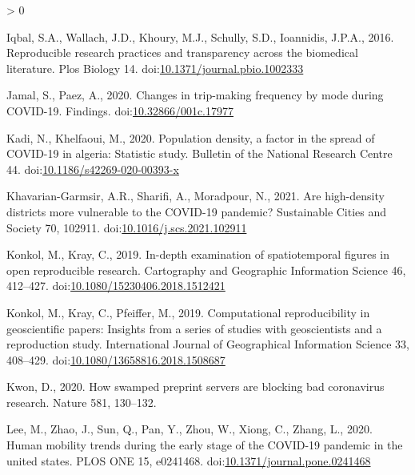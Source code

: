 \documentclass[]{elsarticle} %
\newlength{\cslhangindent}
\newenvironment{CSLReferences}[2] %
 {%
  \setlength{\parindent}{0pt}
  \ifodd #1 \everypar{\setlength{\hangindent}{\cslhangindent}}\ignorespaces\fi
  \ifnum #2 > 0
  \setlength{\parskip}{#2\baselineskip}
  \fi
 }%
 {}
\begin{document}
\begin{CSLReferences}{1}{0}
\leavevmode\hypertarget{ref-Iqbal2016reproducible}{}%
Iqbal, S.A., Wallach, J.D., Khoury, M.J., Schully, S.D., Ioannidis,
J.P.A., 2016. Reproducible research practices and transparency across
the biomedical literature. Plos Biology 14.
doi:\href{https://doi.org/10.1371/journal.pbio.1002333}{10.1371/journal.pbio.1002333}

\leavevmode\hypertarget{ref-Jamal2020Changes}{}%
Jamal, S., Paez, A., 2020. Changes in trip-making frequency by mode
during COVID-19. Findings.
doi:\href{https://doi.org/10.32866/001c.17977}{10.32866/001c.17977}

\leavevmode\hypertarget{ref-Kadi2020population}{}%
Kadi, N., Khelfaoui, M., 2020. Population density, a factor in the
spread of COVID-19 in algeria: Statistic study. Bulletin of the National
Research Centre 44.
doi:\href{https://doi.org/10.1186/s42269-020-00393-x}{10.1186/s42269-020-00393-x}

\leavevmode\hypertarget{ref-Khavarian2021high}{}%
Khavarian-Garmsir, A.R., Sharifi, A., Moradpour, N., 2021. Are
high-density districts more vulnerable to the COVID-19 pandemic?
Sustainable Cities and Society 70, 102911.
doi:\href{https://doi.org/10.1016/j.scs.2021.102911}{10.1016/j.scs.2021.102911}

\leavevmode\hypertarget{ref-Konkol2019examination}{}%
Konkol, M., Kray, C., 2019. In-depth examination of spatiotemporal
figures in open reproducible research. Cartography and Geographic
Information Science 46, 412--427.
doi:\href{https://doi.org/10.1080/15230406.2018.1512421}{10.1080/15230406.2018.1512421}

\leavevmode\hypertarget{ref-Konkol2019computational}{}%
Konkol, M., Kray, C., Pfeiffer, M., 2019. Computational reproducibility
in geoscientific papers: Insights from a series of studies with
geoscientists and a reproduction study. International Journal of
Geographical Information Science 33, 408--429.
doi:\href{https://doi.org/10.1080/13658816.2018.1508687}{10.1080/13658816.2018.1508687}

\leavevmode\hypertarget{ref-Kwon2021swamped}{}%
Kwon, D., 2020. How swamped preprint servers are blocking bad
coronavirus research. Nature 581, 130--132.

\leavevmode\hypertarget{ref-Lee2020human}{}%
Lee, M., Zhao, J., Sun, Q., Pan, Y., Zhou, W., Xiong, C., Zhang, L.,
2020. Human mobility trends during the early stage of the COVID-19
pandemic in the united states. PLOS ONE 15, e0241468.
doi:\href{https://doi.org/10.1371/journal.pone.0241468}{10.1371/journal.pone.0241468}


\end{CSLReferences}
\end{document}
